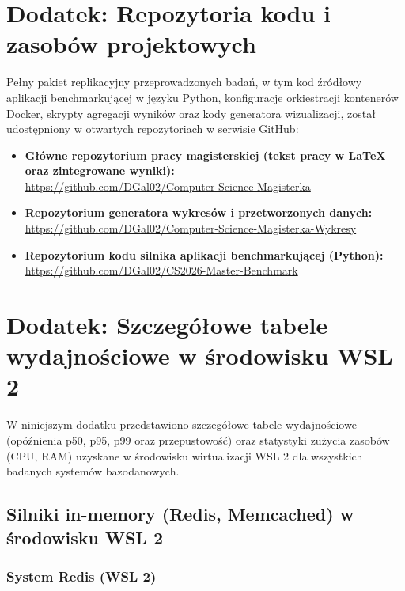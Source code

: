 \appendix %

\chapter{Dodatek: Repozytoria kodu i zasobów projektowych}
\label{chap:dodatek_repozytorium}
Pełny pakiet replikacyjny przeprowadzonych badań, w tym kod źródłowy aplikacji benchmarkującej w języku Python, konfiguracje orkiestracji kontenerów Docker, skrypty agregacji wyników oraz kody generatora wizualizacji, został udostępniony w otwartych repozytoriach w serwisie GitHub:
\begin{itemize}
    \item \textbf{Główne repozytorium pracy magisterskiej (tekst pracy w LaTeX oraz zintegrowane wyniki):} \\ \url{https://github.com/DGal02/Computer-Science-Magisterka}
    \item \textbf{Repozytorium generatora wykresów i przetworzonych danych:} \\ \url{https://github.com/DGal02/Computer-Science-Magisterka-Wykresy}
    \item \textbf{Repozytorium kodu silnika aplikacji benchmarkującej (Python):} \\ \url{https://github.com/DGal02/CS2026-Master-Benchmark}
\end{itemize}

\chapter{Dodatek: Szczegółowe tabele wydajnościowe w środowisku WSL 2}
\label{chap:dodatek_tabele_wsl}

W niniejszym dodatku przedstawiono szczegółowe tabele wydajnościowe (opóźnienia p50, p95, p99 oraz przepustowość) oraz statystyki zużycia zasobów (CPU, RAM) uzyskane w środowisku wirtualizacji WSL 2 dla wszystkich badanych systemów bazodanowych.

\section{Silniki in-memory (Redis, Memcached) w środowisku WSL 2}

\subsection{System Redis (WSL 2)}





\clearpage

